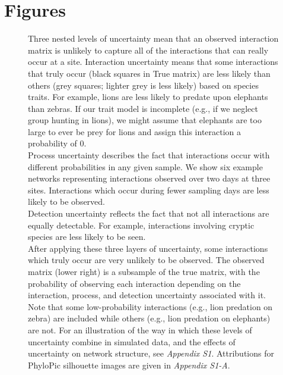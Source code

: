 \documentclass[12pt]{article}
\begin{document}
\section*{Figures}

  \begin{figure}[h!]
    \caption{Three nested levels of uncertainty mean that an observed interaction matrix is unlikely to capture all of the interactions that can really occur at a site. Interaction uncertainty means that some interactions that truly occur (black squares in True matrix) are less likely than others (grey squares; lighter grey is less likely) based on species traits. For example, lions are less likely to predate upon elephants than zebras. If our trait model is incomplete (e.g., if we neglect group hunting in lions), we might assume that elephants are too large to ever be prey for lions and assign this interaction a probability of 0.\\
    \indent Process uncertainty describes the fact that interactions occur with different probabilities in any given sample. We show six example networks representing interactions observed over two days at three sites. Interactions which occur during fewer sampling days are less likely to be observed.\\
    \indent Detection uncertainty reflects the fact that not all interactions are equally detectable. For example, interactions involving cryptic species are less likely to be seen.\\
    \indent After applying these three layers of uncertainty, some interactions which truly occur are very unlikely to be observed. The observed matrix (lower right) is a subsample of the true matrix, with the probability of observing each interaction depending on the interaction, process, and detection uncertainty associated with it. Note that some low-probability interactions (e.g., lion predation on zebra) are included while others (e.g., lion predation on elephants) are not. For an illustration of the way in which these levels of uncertainty combine in simulated data, and the effects of uncertainty on network structure, see \emph{Appendix S1}. Attributions for PhyloPic silhouette images are given in \emph{Appendix S1-A}.}
    \label{conceptual_fig}
    \begin{center}
    \end{center}
    \end{figure}
\end{document}
